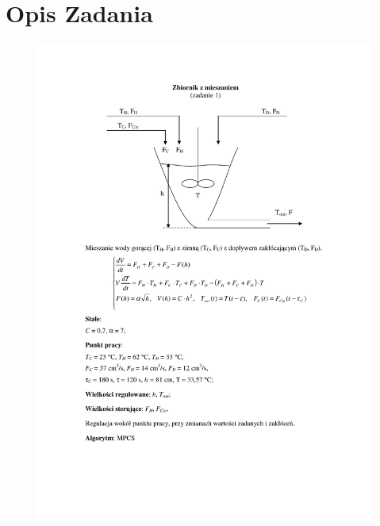 \section{Opis Zadania}
\begin{figure}[h!]
    \centering
\includegraphics[width=1\linewidth]{img/introduction/TAPtask1.pdf}
\end{figure}